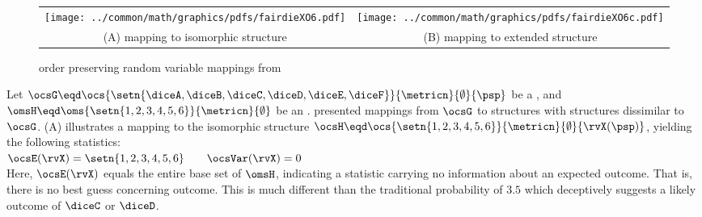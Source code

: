 \begin{tabstr}{0.75}
\begin{figure}[h][h]
  \centering%
  \gsize%
  \begin{tabular}{c@{\qquad\qquad}c}
    {\texttt{[image: ../common/math/graphics/pdfs/fairdieXO6.pdf]}}&{\texttt{[image: ../common/math/graphics/pdfs/fairdieXO6c.pdf]}} \\
    (A) mapping to isomorphic structure  & (B) mapping to extended structure
  \end{tabular}
  \caption{order preserving random variable mappings from \label{fig:fairdieXO6}}
\end{figure}
\begin{example}
\label{ex:fdieXO6}
Let $\ocsG\eqd\ocs{\setn{\diceA,\diceB,\diceC,\diceD,\diceE,\diceF}}{\metricn}{\emptyset}{\psp}$ 
be a  ,
and $\omsH\eqd\oms{\setn{1,2,3,4,5,6}}{\metricn}{\emptyset}$ 
be an  .
 presented mappings from $\ocsG$ to structures with structures dissimilar to $\ocsG$.
 (A) illustrates a mapping to the isomorphic structure
$\ocsH\eqd\ocs{\setn{1,2,3,4,5,6}}{\metricn}{\emptyset}{\rvX(\psp)}$,
yielding the following statistics:
\\\indentx$
  \ocsE(\rvX)  = \setn{1,2,3,4,5,6} \qquad \ocsVar(\rvX)  = 0
  $\\
Here, $\ocsE(\rvX)$ equals the entire base set of $\omsH$, 
indicating a statistic carrying no information about an expected outcome.
That is, there is no best guess concerning outcome.
This is much different than the traditional probability of $3.5$  which 
deceptively suggests a likely outcome of $\diceC$ or $\diceD$.

\end{example}
\end{tabstr}
